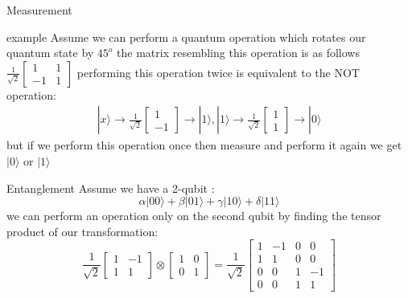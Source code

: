     \begin{frame}{Measurement}
        \begin{exampleblock}{example}
            Assume we can perform a quantum operation which rotates our quantum state
            by $45^o$ the matrix resembling this operation is as follows
            $ \frac{1}{\sqrt{2}}
            \begin{bmatrix}
                1&1\\
                -1&1
            \end{bmatrix}$
            performing this operation twice is equivalent to the NOT operation:\\
            \begin{align*}
                |x\rangle \rightarrow 
                \frac{1}{\sqrt{2}}
                    \begin{bmatrix}
                        1\\
                        -1
                    \end{bmatrix}
                    \rightarrow |1\rangle,
                |1\rangle \rightarrow 
                \frac{1}{\sqrt{2}}
                    \begin{bmatrix}
                        1\\
                        1
                    \end{bmatrix}
                    \rightarrow |0\rangle
            \end{align*}
            but if we perform this operation once then measure and perform it again we get $|0\rangle$ or $|1\rangle$
            
        \end{exampleblock}
    \end{frame}
    \begin{frame}{Entanglement}
        Assume we have a 2-qubit :
        $$\alpha |00\rangle + \beta |01\rangle + \gamma |10\rangle + \delta |11\rangle$$
        we can perform an operation only on the second qubit by finding the tensor product of our transformation:
        $$
        \frac{1}{\sqrt{2}}
            \begin{bmatrix}
                1&-1\\
                1&1
            \end{bmatrix}
            \otimes \begin{bmatrix}
                1&0\\
                0&1
            \end{bmatrix}
            = \frac{1}{\sqrt{2}}
            \begin{bmatrix}
                1&-1&0&0\\
                1&1&0&0\\
                0&0&1&-1\\
                0&0&1&1
            \end{bmatrix}
        $$
    \end{frame}
